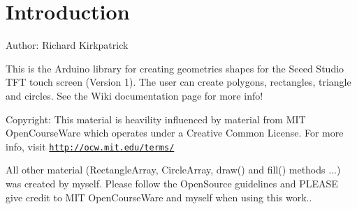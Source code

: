 \hypertarget{index_intro_sec}{}\section{Introduction}\label{index_intro_sec}
Author\+: Richard Kirkpatrick

This is the Arduino library for creating geometries shapes for the Seeed Studio T\+F\+T touch screen (Version 1). The user can create polygons, rectangles, triangle and circles. See the Wiki documentation page for more info!

Copyright\+: This material is heavility influenced by material from M\+I\+T Open\+Course\+Ware which operates under a Creative Common License. For more info, visit \href{http://ocw.mit.edu/terms/}{\tt http\+://ocw.\+mit.\+edu/terms/}

All other material (Rectangle\+Array, Circle\+Array, draw() and fill() methods ...) was created by myself. Please follow the Open\+Source guidelines and P\+L\+E\+A\+S\+E give credit to M\+I\+T Open\+Course\+Ware and myself when using this work.. 